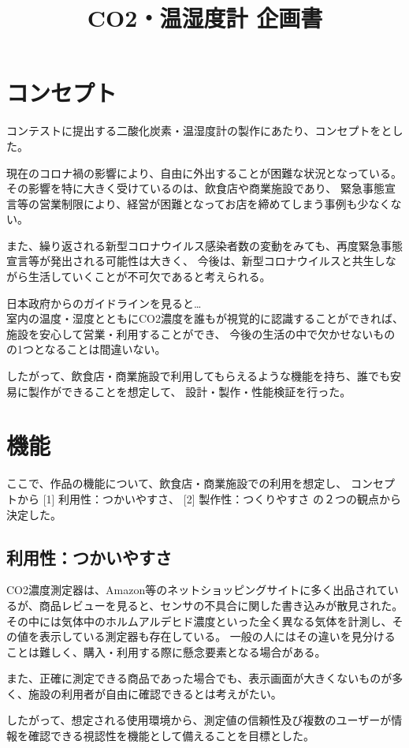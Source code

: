 \documentclass[a4paper]{jsarticle}
\author{}
\title{CO2・温湿度計 企画書}
\date{}
\begin{document}
\maketitle
\section{コンセプト}
コンテストに提出する二酸化炭素・温湿度計の製作にあたり、コンセプトをとした。\par
現在のコロナ禍の影響により、自由に外出することが困難な状況となっている。
その影響を特に大きく受けているのは、飲食店や商業施設であり、
緊急事態宣言等の営業制限により、経営が困難となってお店を締めてしまう事例も少なくない。\par
また、繰り返される新型コロナウイルス感染者数の変動をみても、再度緊急事態宣言等が発出される可能性は大きく、
今後は、新型コロナウイルスと共生しながら生活していくことが不可欠であると考えられる。\par
日本政府からのガイドラインを見ると…\\
室内の温度・湿度とともにCO2濃度を誰もが視覚的に認識することができれば、施設を安心して営業・利用することができ、
今後の生活の中で欠かせないものの1つとなることは間違いない。\par
したがって、飲食店・商業施設で利用してもらえるような機能を持ち、誰でも安易に製作ができることを想定して、
設計・製作・性能検証を行った。
\section{機能}
ここで、作品の機能について、飲食店・商業施設での利用を想定し、
コンセプトから [1] 利用性：つかいやすさ、 [2] 製作性：つくりやすさ の２つの観点から決定した。
\subsection{利用性：つかいやすさ}
CO2濃度測定器は、Amazon等のネットショッピングサイトに多く出品されているが、商品レビューを見ると、センサの不具合に関した書き込みが散見された。
その中には気体中のホルムアルデヒド濃度といった全く異なる気体を計測し、その値を表示している測定器も存在している。
一般の人にはその違いを見分けることは難しく、購入・利用する際に懸念要素となる場合がある。\par
また、正確に測定できる商品であった場合でも、表示画面が大きくないものが多く、施設の利用者が自由に確認できるとは考えがたい。\par
したがって、想定される使用環境から、測定値の信頼性及び複数のユーザーが情報を確認できる視認性を機能として備えることを目標とした。
\end{document}
